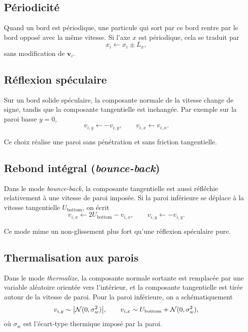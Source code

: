 \documentclass[11pt,a4paper]{article}
\begin{document}
\subsection{Périodicité}

Quand un bord est périodique, une particule qui sort par ce bord rentre par le bord opposé avec la même vitesse. Si l'axe $x$ est périodique, cela se traduit par
\begin{equation}
 x_i \leftarrow x_i \pm L_x,
\end{equation}
sans modification de $\bm{v}_i$.

\subsection{Réflexion spéculaire}

Sur un bord solide spéculaire, la composante normale de la vitesse change de signe, tandis que la composante tangentielle est inchangée. Par exemple sur la paroi basse $y=0$,
\begin{equation}
 v_{i,y} \leftarrow -v_{i,y},
\qquad
 v_{i,x} \leftarrow v_{i,x}.
\end{equation}

Ce choix réalise une paroi sans pénétration et sans friction tangentielle.

\subsection{Rebond intégral (\emph{bounce-back})}

Dans le mode \emph{bounce-back}, la composante tangentielle est aussi réfléchie relativement à une vitesse de paroi imposée. Si la paroi inférieure se déplace à la vitesse tangentielle $U_{\mathrm{bottom}}$, on écrit
\begin{equation}
 v_{i,x} \leftarrow 2U_{\mathrm{bottom}} - v_{i,x},
\qquad
 v_{i,y} \leftarrow -v_{i,y}.
\end{equation}

Ce mode mime un non-glissement plus fort qu'une réflexion spéculaire pure.

\subsection{Thermalisation aux parois}

Dans le mode \emph{thermalize}, la composante normale sortante est remplacée par une variable aléatoire orientée vers l'intérieur, et la composante tangentielle est tirée autour de la vitesse de paroi. Pour la paroi inférieure, on a schématiquement
\begin{equation}
 v_{i,y} \sim \abs{\mathcal{N}(0,\sigma_w^2)},
\qquad
 v_{i,x} \sim U_{\mathrm{bottom}} + \mathcal{N}(0,\sigma_w^2),
\end{equation}
où $\sigma_w$ est l'écart-type thermique imposé par la paroi.
\end{document}
